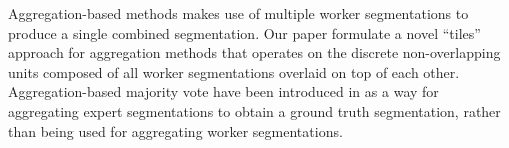 Aggregation-based methods makes use of multiple worker segmentations to produce a single combined segmentation. Our paper formulate a novel ``tiles'' approach for aggregation methods that operates on the discrete non-overlapping units composed of all worker segmentations overlaid on top of each other. Aggregation-based majority vote have been introduced in \cite{Sameki2015} as a way for aggregating expert segmentations to obtain a ground truth segmentation, rather than being used for aggregating worker segmentations. 